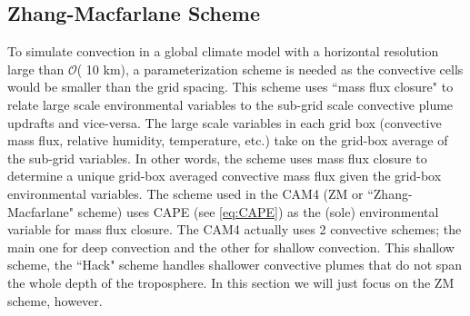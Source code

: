 \documentclass[letterpaper,12pt,titlepage,oneside,final]{book}
\begin{document}
\subsection{Zhang-Macfarlane Scheme}\label{ZM}
To simulate convection in a global climate model with a horizontal resolution large than $\mathcal{O}$( 10 km), a parameterization scheme is needed as the convective cells would be smaller than the grid spacing. This scheme uses ``mass flux closure" to relate large scale environmental variables to the sub-grid scale convective plume updrafts and vice-versa. The large scale variables in each grid box (convective mass flux, relative humidity, temperature, etc.) take on the grid-box average of the sub-grid variables. In other words, the scheme uses mass flux closure to determine a unique grid-box averaged convective mass flux given the grid-box environmental variables. The scheme used in the CAM4 (ZM or ``Zhang-Macfarlane" scheme) \citep{zhang_sensitivity_1995} uses CAPE (see \ref{eq:CAPE}) as the (sole) environmental variable for mass flux closure. The CAM4 actually uses 2 convective schemes; the main one for deep convection and the other for shallow convection. This shallow scheme, the ``Hack" scheme \citep{hack_parameterization_1994} handles shallower convective plumes that do not span the whole depth of the troposphere. In this section we will just focus on the ZM scheme, however.
\end{document}

